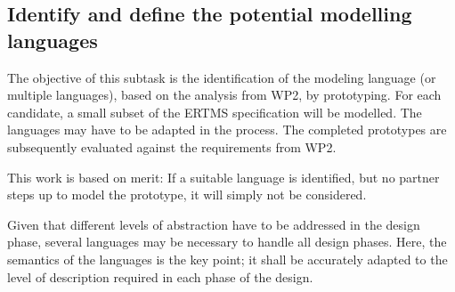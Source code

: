 \documentclass{template/openetcs_article}
\begin{document}
\subsection{Identify and define the potential modelling languages}
\label{sec:language}

The objective of this subtask is the identification of the modeling language (or multiple languages), based on the analysis from WP2, by prototyping.  For each candidate, a small subset of the ERTMS specification will be modelled.  The languages may have to be adapted in the process.
The completed prototypes are subsequently evaluated against the requirements from WP2.

This work is based on merit: If a suitable language is identified, but no partner steps up to model the prototype, it will simply not be considered.




Given that different levels of abstraction have to be addressed in the
design phase, several languages may be necessary to handle all design
phases. Here, the semantics of the languages is the key point; it
shall be accurately adapted to the level of description required in
each phase of the design.
\end{document}
